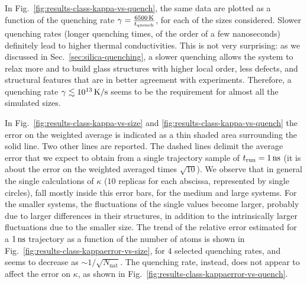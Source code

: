 In Fig.~\ref{fig:results-class-kappa-vs-quench}, the same data are plotted as a function of the quenching rate $\gamma = \frac{6500\,\mathrm{K}}{t_{\mathrm{quench}}}$, for each of the sizes considered. 
Slower quenching rates (longer quenching times, of the order of a few nanoseconds) definitely lead to higher thermal conductivities. 
This is not very surprising: as we discussed in Sec.~\ref{sec:silica-quenching}, a slower quenching allows the system to relax more and to build glass structures with higher local order, less defects, and structural features that are in better agreement with experiments. 
Therefore, a quenching rate $\gamma \lesssim 10^{13}\,\mathrm{K/s}$ seems to be the requirement for almost all the simulated sizes. 

In Fig.~\ref{fig:results-class-kappa-vs-size} and \ref{fig:results-class-kappa-vs-quench} the error on the weighted average is indicated as a thin shaded area surrounding the solid line. Two other lines are reported. The dashed lines delimit the average error that we expect to obtain from a single trajectory sample of $t_{\mathrm{run}}=1\,\mathrm{ns}$ (it is about the error on the weighted averaged times $\sqrt{10}$). 
We observe that in general the single calculations of $\kappa$ ($10$ replicas for each abscissa, represented by single circles), fall mostly inside this error bars, for the medium and large systems. For the smaller systems, the fluctuations of the single values become larger, probably due to larger differences in their structures, in addition to the intrinsically larger fluctuations due to the smaller size. 
The trend of the relative error estimated for a $1\,\mathrm{ns}$ trajectory as a function of the number of atoms is shown in Fig.~\ref{fig:results-class-kappaerror-vs-size}, for $4$ selected quenching rates, and seems to decrease as $\sim 1/\sqrt{N_\mathrm{nat}}$. 
The quenching rate, instead, does not appear to affect the error on $\kappa$, as shown in Fig.~\ref{fig:results-class-kappaerror-vs-quench}. 

